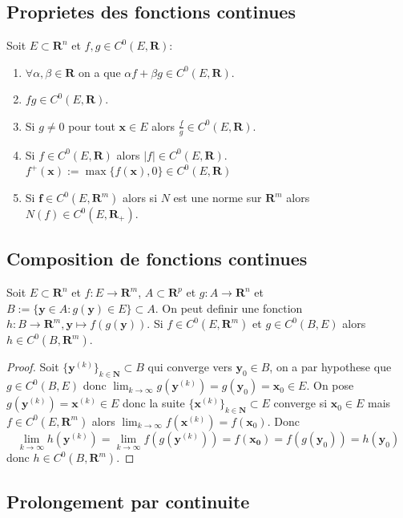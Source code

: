 \subsection{Proprietes des fonctions continues}
Soit $E\subset \mathbf{R}^{n}$ et $f,g\in C^{0}(E,\mathbf{R})$:
\begin{enumerate}
\item $\forall\alpha,\beta \in \mathbf{R}$ on a que $\alpha f+\beta g\in C^{0}(E,\mathbf{R})$.
\item $fg\in C^{0}(E,\mathbf{R})$.
\item Si $g\neq 0$ pour tout $\boldsymbol{x}\in E$ alors $\frac{f}{g}\in C^{0}(E,\mathbf{R})$. 
\item Si $f\in C^{0}(E,\mathbf{R})$ alors $|f|\in C^{0}(E,\mathbf{R})$. $f^{+}(\boldsymbol{x}):=\max\{ f(\boldsymbol{x}),0 \}\in C^{0}(E,\mathbf{R})$ 
\item Si $\boldsymbol{f}\in C^{0}(E,\mathbf{R}^{m})$ alors si $N$ est une norme sur $\mathbf{R}^{m}$ alors $N(f)\in C^{0}(E,\mathbf{R}_{+})$.
\end{enumerate}
\subsection{Composition de fonctions continues}

Soit $E\subset \mathbf{R}^{n}$ et $f:E\to \mathbf{R}^{m}$, $A\subset \mathbf{R}^{p}$ et $g:A\to \mathbf{R}^{n}$ et $B:=\{ \boldsymbol{y}\in A:g(\boldsymbol{y})\in E \}\subset A$. On peut definir une fonction $h:B\to \mathbf{R}^{m},\boldsymbol{y}\mapsto f(g(\boldsymbol{y}))$. Si $f\in C^{0}(E,\mathbf{R}^{m})$ et $g\in C^{0}(B,E)$ alors $h\in C^{0}(B,\mathbf{R}^{m})$.
\begin{proof}
Soit $\{ \boldsymbol{y}^{(k)} \}_{k\in \mathbf{N}}\subset B$ qui converge vers $\boldsymbol{y}_{0}\in B$, on a par hypothese que $g\in C^{0}(B,E)$ donc $\lim_{ k \to \infty }g(\boldsymbol{y}^{(k)})=g(\boldsymbol{y}_{0})=\boldsymbol{x}_{0}\in E$. On pose $g(\boldsymbol{y}^{(k)})=\boldsymbol{x}^{(k)}\in E$ donc la suite $\{ \boldsymbol{x}^{(k)} \}_{k\in \mathbf{N}}\subset E$ converge si $\boldsymbol{x}_{0}\in E$ mais $f\in C^{0}(E,\mathbf{R}^{m})$ alors $\lim_{ k \to \infty }f(\boldsymbol{x}^{(k)})=f(\boldsymbol{x}_{0})$. Donc
$$
\lim_{ k \to \infty } h(\boldsymbol{y}^{(k)})=\lim_{ k \to \infty } f(g(\boldsymbol{y}^{(k)}))=f(\boldsymbol{x_{0}})=f(g(\boldsymbol{y}_{0}))=h(\boldsymbol{y}_{0})
$$
donc $h\in C^{0}(B,\mathbf{R}^{m})$.
\end{proof}
\subsection{Prolongement par continuite}

